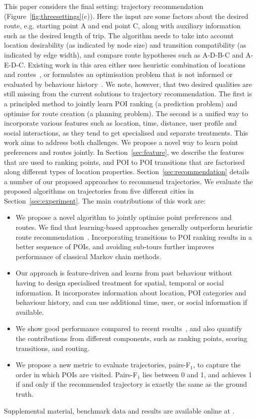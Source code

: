 This paper considers the final setting: trajectory recommendation (Figure~\ref{fig:threesettings}(c)). Here the input are some factors about the desired route, e.g. starting point A and end point C, along with auxiliary information such as the desired length of trip. The algorithm needs to take into account location desirability (as indicated by node size) and transition compatibility (as indicated by edge width), and compare route hypotheses such as A-D-B-C and A-E-D-C. Existing work in this area either uses heuristic combination of locations and routes~\cite{lu2010photo2trip,ijcai15,lu2012personalized}, or formulates an optimisation problem that is not informed or evaluated by behaviour history~\cite{gioniswsdm14,chen2015tripplanner}.
We note, however, that two desired qualities are still
missing from the current solutions to trajectory recommendation.
The first is a principled method to jointly learn POI ranking (a prediction problem)
and optimise for route creation (a planning problem).
The second is a unified way to incorporate various features
such as location, time, distance, user profile and social interactions,
as they tend to get specialised and separate treatments.
This work aims to address both challenges. 
We propose a novel way to learn point preferences and routes jointly.
In Section~\ref{sec:feature}, we describe the features that are used to ranking points,
and POI to POI transitions that are factorised along 
different types of location properties.
Section~\ref{sec:recommendation} details a number of our proposed approaches to recommend trajectories.
We evaluate the proposed algorithms on trajectories from five different cities in Section~\ref{sec:experiment}.
The main contributions of this work are:
\begin{itemize}
\setlength{\itemsep}{-2pt}
\item We propose a novel algorithm to jointly optimise point preferences and routes. We find that learning-based approaches generally outperform heuristic route recommendation~\cite{ijcai15}.
Incorporating transitions to POI ranking results in a better sequence of POIs, and avoiding sub-tours further improves performance of classical Markov chain methods.
\item Our approach is feature-driven and learns from past behaviour without having to design specialised treatment for spatial, temporal or social information. It incorporates information about location, POI categories and behaviour history, and can use additional time, user, or social information if available.
\item We show good performance compared to recent results~\cite{ijcai15}, and also quantify the contributions from different components, such as ranking points, scoring transitions, and routing.
\item We propose a new metric to evaluate trajectories, pairs-F$_1$, to capture the order in which POIs are visited. Pairs-F$_1$ lies between 0 and 1, and achieves 1 if and only if the recommended trajectory is exactly the same as the ground truth.
\end{itemize}
Supplemental material, benchmark data and results are available online at .
